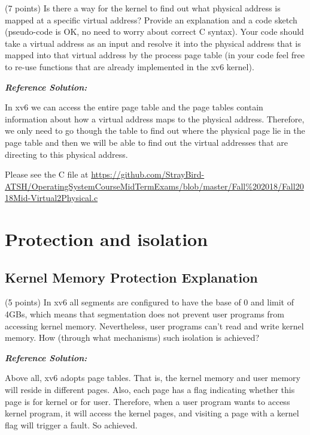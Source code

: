 \documentclass[]{article}
\begin{document}
(7 points) Is there a way for the kernel to find out what physical
address is mapped at a specific virtual address? Provide an explanation
and a code sketch (pseudo-code is OK, no need to worry about correct C
syntax). Your code should take a virtual address as an input and resolve
it into the physical address that is mapped into that virtual address by
the process page table (in your code feel free to re-use functions that
are already implemented in the xv6 kernel).

\textbf{\emph{Reference Solution:}}

In xv6 we can access the entire page table and the page tables contain
information about how a virtual address maps to the physical address.
Therefore, we only need to go though the table to find out where the
physical page lie in the page table and then we will be able to find out
the virtual addresses that are directing to this physical address.

Please see the C file at
\url{https://github.com/StrayBird-ATSH/OperatingSystemCourseMidTermExams/blob/master/Fall\%202018/Fall2018Mid-Virtual2Physical.c}

\hypertarget{protection-and-isolation}{%
\section{Protection and isolation}\label{protection-and-isolation}}

\hypertarget{kernel-memory-protection-explanation}{%
\subsection{Kernel Memory Protection
Explanation}\label{kernel-memory-protection-explanation}}

(5 points) In xv6 all segments are configured to have the base of 0 and
limit of 4GBs, which means that segmentation does not prevent user
programs from accessing kernel memory. Nevertheless, user programs can't
read and write kernel memory. How (through what mechanisms) such
isolation is achieved?

\textbf{\emph{Reference Solution:}}

Above all, xv6 adopts page tables. That is, the kernel memory and user
memory will reside in different pages. Also, each page has a flag
indicating whether this page is for kernel or for user. Therefore, when
a user program wants to access kernel program, it will access the kernel
pages, and visiting a page with a kernel flag will trigger a fault. So
achieved.
\end{document}
